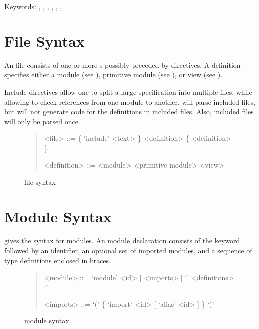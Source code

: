 Keywords: , , , , , , 

\section{File Syntax}

An \asdl{} file consists of one or more s possibly preceded by 
directives.
A definition specifies either a module (see ),
primitive module (see ),
or view (see ).

Include directives allow one to split a large \asdl{} specification into multiple files,
while allowing \asdlgen{} to check references from one module to another.
\asdlgen{} will parse included files, but will not generate code for the definitions in included
files.
Also, included files will only be parsed once.

\begin{figure}[t]
  \begin{quote}
    \begin{grammar}
      <file>  ::=  \{ `include' <text> \} <definition> \{ <definition> \}
      
      <definition> ::= <module>
        \alt{} <primitive-module>
        \alt{} <view>
    \end{grammar}
  \end{quote}
  \caption{\asdl{} file syntax}
  \label{fig:file-syntax}
\end{figure}%

\section{Module Syntax}
\label{sec:module-syntax}

 gives the syntax for modules.
An \asdl{} module declaration consists of the keyword 
followed by an identifier, an optional set of imported modules, and a
sequence of type definitions enclosed in braces.

\begin{figure}[t]
  \begin{quote}
    \begin{grammar}
      <module>  ::=  `module' <id> [ <imports> ] `{' <definitions> `}'

      <imports> ::=  `(' \{ `import' <id> [ `alias' <id> ] \} `)'
    \end{grammar}
  \end{quote}
  \caption{\asdl{} module syntax}
  \label{fig:module-syntax}
\end{figure}%

